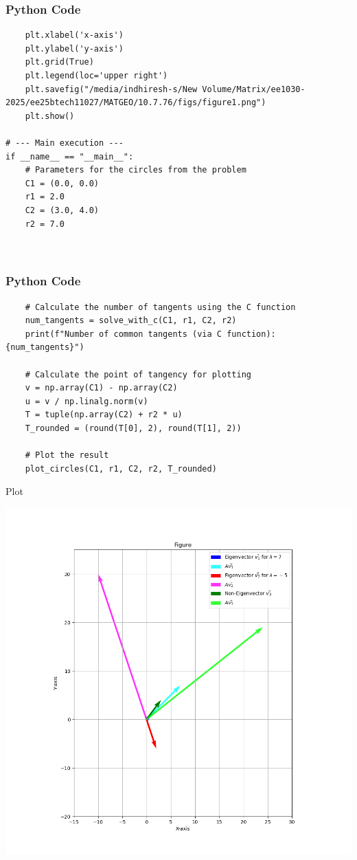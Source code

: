 \documentclass{beamer}
\begin{document}
    \begin{frame}[fragile]
        \frametitle{Python Code}
        \begin{lstlisting}
    plt.xlabel('x-axis')
    plt.ylabel('y-axis')
    plt.grid(True)
    plt.legend(loc='upper right')
    plt.savefig("/media/indhiresh-s/New Volume/Matrix/ee1030-2025/ee25btech11027/MATGEO/10.7.76/figs/figure1.png")
    plt.show()

# --- Main execution ---
if __name__ == "__main__":
    # Parameters for the circles from the problem
    C1 = (0.0, 0.0)
    r1 = 2.0
    C2 = (3.0, 4.0)
    r2 = 7.0

   
        \end{lstlisting}
    \end{frame}

     \begin{frame}[fragile]
        \frametitle{Python Code}
        \begin{lstlisting}
    # Calculate the number of tangents using the C function
    num_tangents = solve_with_c(C1, r1, C2, r2)
    print(f"Number of common tangents (via C function): {num_tangents}")

    # Calculate the point of tangency for plotting
    v = np.array(C1) - np.array(C2)
    u = v / np.linalg.norm(v)
    T = tuple(np.array(C2) + r2 * u)
    T_rounded = (round(T[0], 2), round(T[1], 2))

    # Plot the result
    plot_circles(C1, r1, C2, r2, T_rounded)
        \end{lstlisting}
    \end{frame}
    
    \begin{frame}{Plot}
        \begin{center}
            \includegraphics[width=\columnwidth, height=0.8\textheight, keepaspectratio]{figs/figure1.png}
        \end{center}
    \end{frame}
    
    
\end{document}
